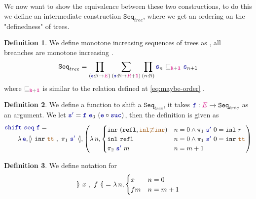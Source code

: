 \documentclass[twoside,11pt,openright]{report}
\theoremstyle{plain} %
\theoremstyle{definition}
\newtheorem{defn}{Definition}[section]
\theoremstyle{remark}
\newcommand*{\type}[1]{\textcolor{magenta!90!black}{#1}}
\newcommand*{\unit}{\type{\textbf{1}}}
\newcommand*{\relation}[1]{\textcolor{gray}{\ensuremath{\mathtt{#1}}}}
\newcommand*{\constant}[1]{\textcolor{orange!60!black}{\ensuremath{\mathtt{#1}}}}
\newcommand*{\function}[1]{\textcolor{blue!60!black}{\ensuremath{\mathtt{#1}}}}
\newcommand*{\typeformer}[1]{\ensuremath{\mathtt{#1}}}
\newcommand*{\natcases}[2]{\ensuremath{\mathbb{[\hspace{-.5mm}\rangle}~\ensuremath{#1}~,~\ensuremath{#2}~\mathbb{\langle\hspace{-.5mm}]}}}
\begin{document}
\\ \\
We now want to show the equivalence between these two constructions, to do this we define an intermediate construction \(\typeformer{Seq}_{tree}\), where we get an ordering on the "definedness" of trees.
\begin{defn}
  We define monotone increasing sequences of trees as , all breanches are monotone increasing .
  \begin{equation}
    \typeformer{Seq}_{tree} = \prod_{(\function{e} : \mathbb{N} \rightarrow \type{E})} \sum_{(\function{s} : \mathbb{N} \rightarrow \type{R} + \unit)} \prod_{(n : \mathbb{N})} \function{s}_n~\relation{\sqsubseteq_{\type{R}+\unit}}~\function{s}_{n+1}
  \end{equation}
  where \(\relation{\sqsubseteq_{\type{R}+\unit}}\) is similar to the relation defined at \eqref{eq:maybe-order} .
\end{defn}
\begin{defn}
  We define a function to shift a \(\typeformer{Seq}_{tree}\), it takes \(\function{f} : \type{E} \rightarrow \typeformer{Seq}_{tree}\) as an argument. We let \(\function{s'} = \function{f}~\function{e}_0~(\function{e} \circ \function{suc})\), then the definition is given as
  \begin{equation}
    \begin{aligned}
      &\function{shift\text{-}seq}~\function{f} = \\[-5mm]
      &\qquad \lambda\,\function{e}, \natcases{\mathtt{inr}~\constant{tt}}{\pi_1~\function{s'}} , \left(\lambda\,n, \begin{cases} \mathtt{inr}~(\mathtt{refl} , \constant{inl{\not\equiv}inr}) & n = 0 \land \pi_1~\function{s'}~0 = \mathtt{inl}~r \\ \mathtt{inl}~\mathtt{refl} & n = 0 \land \pi_1~\function{s'}~0 = \mathtt{inr}~\constant{tt} \\ \pi_2~\function{s'}~m & n = m + 1 \end{cases}\right)
    \end{aligned}
  \end{equation}
\end{defn}
\begin{defn}
  We define notation for
  \begin{equation}
    \natcases{x}{f} = \lambda\,n, \begin{cases} x & n = 0 \\ f m & n = m + 1 \end{cases}
  \end{equation}
\end{defn}
\end{document}
